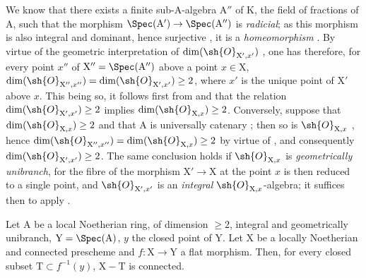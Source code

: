 \begin{remark}[18.9.7.6]
\label{IV.18.9.7.6}
We know  that there exists a finite sub-A-algebra $\mathrm{A}''$ of K, the field of fractions of A, such that the morphism $\Spec(\mathrm{A}')\to\Spec(\mathrm{A}'')$ is \emph{radicial};
as this morphism is also integral and dominant, hence surjective , it is a \emph{homeomorphism} .
By virtue of the geometric interpretation of $\dim(\sh{O}_{\mathrm{X}',x'})$ , one has therefore, for every point $x''$ of $\mathrm{X}''=\Spec(\mathrm{A}'')$ above a point $x\in\mathrm{X}$, $\dim(\sh{O}_{\mathrm{X}'',x''})=\dim(\sh{O}_{\mathrm{X}',x'})\geq 2$, where $x'$ is the unique point of $\mathrm{X}'$ above $x$.
This being so, it follows first from  and  that the relation $\dim(\sh{O}_{\mathrm{X}',x'})\geq 2$ implies $\dim(\sh{O}_{\mathrm{X},x})\geq 2$.
Conversely, suppose that $\dim(\sh{O}_{\mathrm{X},x})\geq 2$ and that A is universally catenary ; then so is $\sh{O}_{\mathrm{X},x}$ , hence $\dim(\sh{O}_{\mathrm{X}'',x''})=\dim(\sh{O}_{\mathrm{X},x})\geq 2$ by virtue of , and consequently $\dim(\sh{O}_{\mathrm{X}',x'})\geq 2$.
The same conclusion holds if $\sh{O}_{\mathrm{X},x}$ is \emph{geometrically unibranch}, for the fibre of the morphism $\mathrm{X}'\to\mathrm{X}$ at the point $x$ is then reduced to a single point, and $\sh{O}_{\mathrm{X}',x'}$ is an \emph{integral} $\sh{O}_{\mathrm{X},x}$-algebra;
it suffices then to apply .
\end{remark}

\begin{lemma}[18.9.7.7]
\label{IV.18.9.7.7}
Let $\mathrm{A}$ be a local Noetherian ring, of dimension $\geq 2$, integral and geometrically unibranch, $\mathrm{Y}=\Spec(\mathrm{A})$, $y$ the closed point of Y.
Let $\mathrm{X}$ be a locally Noetherian and connected prescheme and $f:\mathrm{X}\to\mathrm{Y}$ a flat morphism.
Then, for every closed subset $\mathrm{T}\subset f^{-1}(y)$, $\mathrm{X}-\mathrm{T}$ is connected.
\end{lemma}

